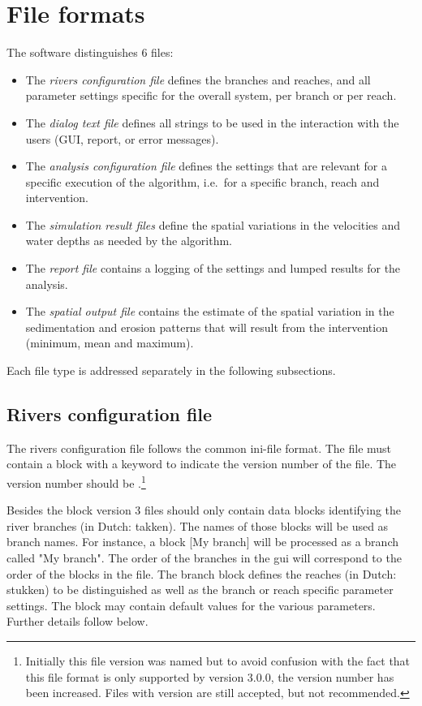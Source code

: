 \chapter{File formats}

The software distinguishes 6 files:

\begin{itemize}
\item The \emph{rivers configuration file} defines the branches and reaches, and all parameter settings specific for the overall system, per branch or per reach.
\item The \emph{dialog text file} defines all strings to be used in the interaction with the users (GUI, report, or error messages).
\item The \emph{analysis configuration file} defines the settings that are relevant for a specific execution of the algorithm, i.e.~for a specific branch, reach and intervention.
\item The \emph{simulation result files} define the spatial variations in the velocities and water depths as needed by the algorithm.
\item The \emph{report file} contains a logging of the settings and lumped results for the analysis.
\item The \emph{spatial output file} contains the estimate of the spatial variation in the sedimentation and erosion patterns that will result from the intervention (minimum, mean and maximum).
\end{itemize}

Each file type is addressed separately in the following subsections.

\section{Rivers configuration file}\label{sec:rivers-config}

The rivers configuration file follows the common ini-file format.
The file must contain a \keyw{[General]} block with a keyword  to indicate the version number of the file.
The version number should be .\footnote{Initially this file version was named  but to avoid confusion with the fact that this file format is only supported by \dfastmi version 3.0.0, the version number has been increased.
Files with version  are still accepted, but not recommended.}

Besides the \keyw{[General]} block version 3 files should only contain data blocks identifying the river branches (in Dutch: takken).
The names of those blocks will be used as branch names.
For instance, a block [My branch] will be processed as a branch called "My branch".
The order of the branches in the gui will correspond to the order of the blocks in the file.
The branch block defines the reaches (in Dutch: stukken) to be distinguished as well as the branch or reach specific parameter settings.
The \keyw{[General]} block may contain default values for the various parameters.
Further details follow below.


